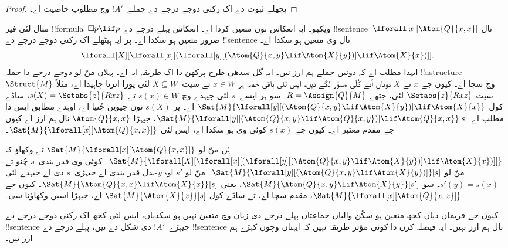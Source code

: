 \documentclass[../../../include/open-logic-section]{subfiles}
\begin{document}
\begin{proof}
  پچھلے ثبوت دے اک رکنی دوجے درجے دے جملے~$!A'$ وچ مطلوب خاصیت اے۔
\end{proof}

مثال لئی فیر !!{formula}~$\Box p \lif p$ ویکھو۔ ایہ انعکاس نوں متعین کردا اے۔ انعکاس پہلے درجے دے !!{sentence}~$\lforall[x][\Atom{Q}{x,x}]$ نال ضرور متعین ہو سکدا اے۔ پر ایہ ہِیٹھلے اک رکنی دوجے درجے دے !!{sentence} نال وی متعین ہو سکدا اے۔
\[
\lforall[X][\lforall[x][(\lforall[y][(\Atom{Q}{x,y} \lif \Atom{X}{y})]
    \lif \Atom{X}{x})]].
\]
ایہدا مطلب اے کہ دونیں جملے ہم ارز نیں۔ ایہ گل سدھی طرح پرکھن دا اک طریقہ ایہ اے۔ پہلاں منّ لو دوجے درجے دا جملہ !!a{structure}~$\Struct{M}$ وچ سچا اے۔ کیوں جے $x$ تے $X$ دوناں اُتے کُلّی مسوّر لگے نیں، ایس لئی باقی حصہ ہر $x \in W$ تے سیٹ~$X \subseteq W$ لئی پورا اترنا چاہیدا اے، مثلاً سیٹ $\Setabs{z}{Rxz}$ لئی، جتھے $R =
\Assign{Q}{M}$۔ سو ہر ایسے~$s$ لئی جیہدے وچ $s(x) \in W$ تے $s(X) =
\Setabs{z}{Rxz}$، ساڈے کول $\Sat{M}{\lforall[y][(\Atom{Q}{x,y} \lif
    \Atom{X}{y})] \lif \Atom{X}{x}}$ اے۔ پر $s(X)$ نوں جیویں چُنیا اے، اوہدے مطابق ایس دا مطلب اے $\Sat{M}{\lforall[y][(\Atom{Q}{x,y} \lif
    \Atom{Q}{x,y})] \lif \Atom{Q}{x,x}}[s]$، جیہڑا $\Atom{Q}{x,x}$ نال ہم ارز اے کیوں جے مقدم معتبر اے۔ کیوں جے $s(x)$ کوئی وی ہو سکدا اے، ایس لئی $\Sat{M}{\lforall[x][\Atom{Q}{x,x}]}$۔

ہُن منّ لو $\Sat{M}{\lforall[x][\Atom{Q}{x,x}]}$ تے وکھاؤ کہ
$\Sat{M}{\lforall[X][\lforall[x][(\lforall[y][(\Atom{Q}{x,y} \lif
        \Atom{X}{y})] \lif \Atom{X}{x})]]}$۔ کوئی وی قدر بندی~$s$ چُنو تے منّ لو $\Sat{M}{\lforall[y][(\Atom{Q}{x,y} \lif
    \Atom{X}{y})]}[s]$۔ منّ لو $s'$ اوہ $y$-بدل قدر بندی اے جیہڑی~$s$ دی اے جیہدے لئی $s'(y)
= s(x)$۔ سو $\Sat{M}{\Atom{Q}{x,y} \lif \Atom{X}{y}}[s']$، یعنی
$\Sat{M}{\Atom{Q}{x,x} \lif \Atom{X}{x}}[s]$۔ کیوں جے
$\Sat{M}{\lforall[x][\Atom{Q}{x,x}]}$، مقدم سچا اے، تے ساڈے کول
$\Sat{M}{\Atom{X}{x}}[s]$ اے، جیہڑا اسیں وکھاؤنا سی۔

کیوں جے فریماں دیاں کجھ متعین ہو سکّن والیاں جماعتاں پہلے درجے دی زبان وچ متعین نہیں ہو سکدیاں، ایس لئی کجھ اک رکنی دوجے درجے دے !!{sentence} جیہڑے~$!A'$ دی شکل دے نیں، پہلے درجے دے !!{sentence} نال ہم ارز نہیں۔ ایہ فیصلہ کرن دا کوئی مؤثر طریقہ نہیں کہ ایہناں وچوں کہڑے ہم ارز نیں۔
\end{document}
